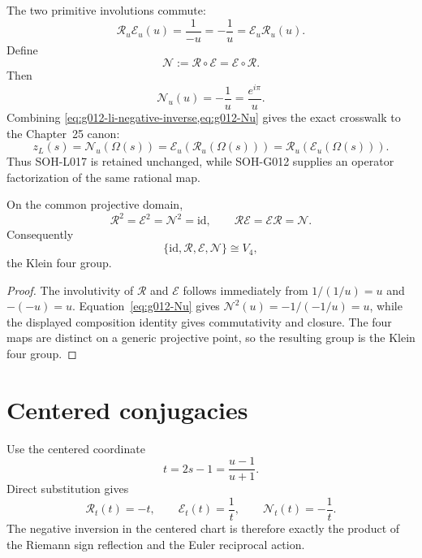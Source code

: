 The two primitive involutions commute:
\[
 \mathcal R_u\mathcal E_u(u)
 =\frac1{-u}
 =-\frac1u
 =\mathcal E_u\mathcal R_u(u).
\]
Define
\[
 \mathcal N:=\mathcal R\circ\mathcal E
 =\mathcal E\circ\mathcal R.
\]
Then
\begin{equation}
 \boxed{\mathcal N_u(u)=-\frac1u=\frac{e^{i\pi}}u}.
 \label{eq:g012-Nu}
\end{equation}
Combining \cref{eq:g012-li-negative-inverse,eq:g012-Nu} gives the exact
crosswalk to the Chapter~25 canon:
\begin{equation}
 \boxed{
 z_L(s)
 =\mathcal N_u(\Omega(s))
 =\mathcal E_u\!\left(\mathcal R_u(\Omega(s))\right)
 =\mathcal R_u\!\left(\mathcal E_u(\Omega(s))\right).
 }
 \label{eq:g012-li-factorization}
\end{equation}
Thus SOH-L017 is retained unchanged, while SOH-G012 supplies an operator
factorization of the same rational map.

\begin{theorem}
On the common projective domain,
\[
 \mathcal R^2=\mathcal E^2=\mathcal N^2=\mathrm{id},
 \qquad
 \mathcal R\mathcal E=\mathcal E\mathcal R=\mathcal N.
\]
Consequently
\[
 \boxed{\{\mathrm{id},\mathcal R,\mathcal E,\mathcal N\}\cong V_4},
\]
the Klein four group.
\end{theorem}

\begin{proof}
The involutivity of \(\mathcal R\) and \(\mathcal E\) follows immediately from
\(1/(1/u)=u\) and \(-(-u)=u\).  Equation~\eqref{eq:g012-Nu} gives
\(\mathcal N^2(u)=-1/(-1/u)=u\), while the displayed composition identity gives
commutativity and closure.  The four maps are distinct on a generic projective
point, so the resulting group is the Klein four group.
\end{proof}

\section{Centered conjugacies}

Use the centered coordinate
\[
 t=2s-1=\frac{u-1}{u+1}.
\]
Direct substitution gives
\begin{equation}
 \boxed{\mathcal R_t(t)=-t},
 \qquad
 \boxed{\mathcal E_t(t)=\frac1t},
 \qquad
 \boxed{\mathcal N_t(t)=-\frac1t}.
 \label{eq:g012-t-actions}
\end{equation}
The negative inversion in the centered chart is therefore exactly the product
of the Riemann sign reflection and the Euler reciprocal action.

